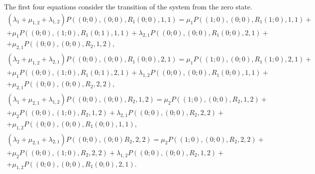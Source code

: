 \documentclass[default]{subfiles}
\begin{document}
{The first four equations consider the transition of the system from
the zero state.
\begin{multline}
  \left(\lambda_1+\mu_{1,2}+\lambda_{1,2}\right)
  P\left((0;0),(0;0),R_1(0;0),1,1\right)=\mu_1
  P\left((1;0),(0;0),R_1(1;0),1,1\right)+\\ +\mu_1
  P\left((0;0),(1;0),R_1(0;1),1,1\right)+\lambda_{2,1}
  P\left((0;0),(0;0),R_1(0;0),2,1\right)+\\ +\mu_{2,1}
  P\left((0;0),(0;0),R_2,1,2\right),
\label{eq:1.1}
\end{multline}
\begin{multline}
  \left(\lambda_2+\mu_{1,2}+\lambda_{2,1}\right)
  P\left((0;0),(0;0),R_1(0;0),2,1\right)=\mu_1
  P\left((1;0),(0;0),R_1(1;0),2,1\right)+\\ +\mu_1
  P\left((0;0),(1;0),R_1(0;1),2,1\right)+\lambda_{1,2}
  P\left((0;0),(0;0),R_1(0;0),1,1\right)+\\ +\mu_{2,1}
  P\left((0;0),(0;0),R_2,2,2\right),
\label{eq:1.2}
\end{multline}
\begin{multline}
  \left(\lambda_1+\mu_{2,1}+\lambda_{1,2}\right)
  P\left((0;0),(0;0),R_2,1,2\right)=\mu_2
  P\left((1;0),(0;0),R_2,1,2\right)+\\ +\mu_2
  P\left((0;0),(1;0),R_2,1,2\right)+\lambda_{2,1}
  P\left((0;0),(0;0),R_2,2,2\right)+\\ +\mu_{1,2}
  P\left((0;0),(0;0),R_1(0;0),1,1\right),
\label{eq:1.3}
\end{multline}
\begin{multline}
  \left(\lambda_2+\mu_{2,1}+\lambda_{2,1}\right)
  P\left((0;0),(0;0)R_2,2,2\right)=\mu_2
  P\left((1;0),(0;0),R_2,2,2\right)+\\ +\mu_2
  P\left((0;0),(1;0),R_2,2,2\right)+\lambda_{1,2}P\left((0;0),(0;0),R_2,1,2\right)+\\
  +\mu_{1,2}P\left((0;0),(0;0),R_1(0;0),2,1\right).
\label{eq:1.4}
\end{multline}

}
\end{document}
